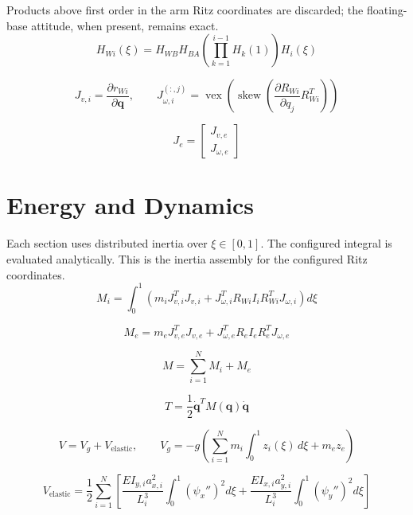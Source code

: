 \documentclass[11pt]{article}
\begin{document}
Products above first order in the arm Ritz coordinates are discarded; the floating-base attitude, when present, remains exact.
\begin{equation}
H_{Wi}(\xi)=H_{WB}H_{BA}\left(\prod_{k=1}^{i-1}H_k(1)\right)H_i(\xi)
\end{equation}

\begin{equation}
J_{v,i}=\frac{\partial r_{Wi}}{\partial\boldsymbol q},\qquad J_{\omega,i}^{(:,j)}=\operatorname{vex}\!\left(\operatorname{skew}\!\left(\frac{\partial R_{Wi}}{\partial q_j}R_{Wi}^{T}\right)\right)
\end{equation}

\begin{equation}
J_e=\begin{bmatrix}J_{v,e}\\J_{\omega,e}\end{bmatrix}
\end{equation}


\section{Energy and Dynamics}
Each section uses distributed inertia over $\xi\in[0,1]$. The configured integral is evaluated analytically. This is the inertia assembly for the configured Ritz coordinates.
\begin{equation}
M_i=\int_0^1\!\left(m_iJ_{v,i}^{T}J_{v,i}+J_{\omega,i}^{T}R_{Wi}I_iR_{Wi}^{T}J_{\omega,i}\right)d\xi
\end{equation}

\begin{equation}
M_e=m_eJ_{v,e}^{T}J_{v,e}+J_{\omega,e}^{T}R_eI_eR_e^TJ_{\omega,e}
\end{equation}

\begin{equation}
M=\sum_{i=1}^{N}M_i+M_e\label{eq:mass-assembly}
\end{equation}

\begin{equation}
T=\frac12\dot{\boldsymbol q}^{T}M(\boldsymbol q)\dot{\boldsymbol q}
\end{equation}

\begin{equation}
V=V_g+V_{\mathrm{elastic}},\qquad V_g=-g\!\left(\sum_{i=1}^{N}m_i\int_0^1z_i(\xi)\,d\xi+m_ez_e\right)
\end{equation}

\begin{equation}
V_{\mathrm{elastic}}=\frac12\sum_{i=1}^{N}\left[\frac{EI_{y,i}a_{x,i}^{2}}{L_i^3}\int_0^1(\psi_x'')^2d\xi+\frac{EI_{x,i}a_{y,i}^{2}}{L_i^3}\int_0^1(\psi_y'')^2d\xi\right]
\end{equation}
\end{document}
